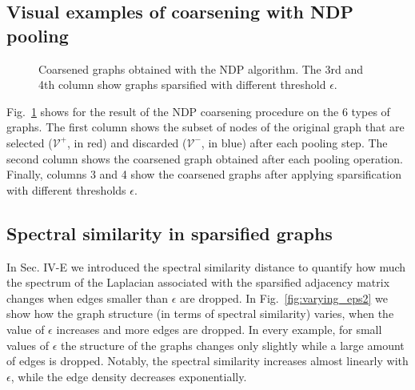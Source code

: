 \documentclass[journal]{IEEEtran}
\begin{document}
\subsection{Visual examples of coarsening with NDP pooling}

\begin{figure}[!pt]
    \centering
    
    
    
    \caption{Coarsened graphs obtained with the NDP algorithm. The 3rd and 4th column show graphs sparsified with different threshold $\epsilon$.}
    \label{fig:visualization_grid}
\end{figure}

Fig.~\ref{fig:visualization_grid} shows for the result of the NDP coarsening procedure on the 6 types of graphs.
The first column shows the subset of nodes of the original graph that are selected ($\mathcal{V}^{+}$, in red) and discarded ($\mathcal{V}^{-}$, in blue) after each pooling step.
The second column shows the coarsened graph obtained after each pooling operation.
Finally, columns 3 and 4 show the coarsened graphs after applying sparsification with different thresholds $\epsilon$.





\subsection{Spectral similarity in sparsified graphs}

In Sec. IV-E we introduced the spectral similarity distance to quantify how much the spectrum of the Laplacian associated with the sparsified adjacency matrix changes when edges smaller than $\epsilon$ are dropped.
In Fig.~\ref{fig:varying_eps2} we show how the graph structure (in terms of spectral similarity) varies, when the value of $\epsilon$ increases and more edges are dropped.
In every example, for small values of $\epsilon$ the structure of the graphs changes only slightly while a large amount of edges is dropped.
Notably, the spectral similarity increases almost linearly with $\epsilon$, while the edge density decreases exponentially.
\end{document}

